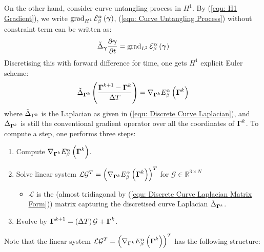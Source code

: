 \documentclass[../dissertation.tex]{subfiles}
\begin{document}
On the other hand, consider curve untangling process in $H^1$.
By (\ref{equ: H1 Gradient}), we write $\operatorname{grad}_{H^1} \mathcal{E}_{\beta}^{\alpha} \left( \boldsymbol{\gamma} \right)$,
(\ref{equ: Curve Untangling Process}) without constraint term can be written as:
\begin{equation}
    \tilde{\Delta}_{\boldsymbol{\gamma}} \frac{\partial \boldsymbol{\gamma}}{\partial t} = \operatorname{grad}_{L^2} \mathcal{E}_{\beta}^{\alpha} \left( \boldsymbol{\gamma} \right)
\end{equation}
Discretising this with forward difference for time, one gets $H^1$ explicit Euler scheme:
\begin{equation}
    \tilde{\Delta}_{\boldsymbol{\Gamma}^k} \left( \frac{\boldsymbol{\Gamma}^{k+1} - \boldsymbol{\Gamma}^k}{\Delta T} \right) = \nabla_{\boldsymbol{\Gamma}^k} E_{\beta}^{\alpha} \left( \boldsymbol{\Gamma}^k \right)
\end{equation}
where $\tilde{\Delta}_{\boldsymbol{\Gamma}^k}$ is the Laplacian as given in (\ref{equ: Discrete Curve Laplacian}),
and $\Delta_{\boldsymbol{\Gamma}^k}$ is still the conventional gradient operator over all the coordinates of $\boldsymbol{\Gamma}^k$.
To compute a step, one performs three steps:
\begin{enumerate}
    \item Compute $\nabla_{\boldsymbol{\Gamma}^k} E_{\beta}^{\alpha} \left( \boldsymbol{\Gamma}^k \right)$.
    \item Solve linear system $\mathcal{L} \mathcal{G}^{T} = \left( \nabla_{\boldsymbol{\Gamma}^k} E_{\beta}^{\alpha} \left( \boldsymbol{\Gamma}^k \right) \right)^T$ for $\mathcal{G} \in \mathbb{R}^{3 \times N}$
        \begin{itemize}
            \item $\mathcal{L}$ is the (almost tridiagonal by (\ref{equ: Discrete Curve Laplacian Matrix Form})) matrix capturing the discretised curve Laplacian $\tilde{\Delta}_{\boldsymbol{\Gamma}^k}$.
        \end{itemize}
    \item Evolve by $\boldsymbol{\Gamma}^{k+1} = \left( \Delta T \right) \mathcal{G} + \boldsymbol{\Gamma}^k$.
\end{enumerate}
Note that the linear system $\mathcal{L} \mathcal{G}^T = \left( \nabla_{\boldsymbol{\Gamma}^k} E_{\beta}^{\alpha} \left( \boldsymbol{\Gamma}^k \right) \right)^T$ has the following structure:
\end{document}
